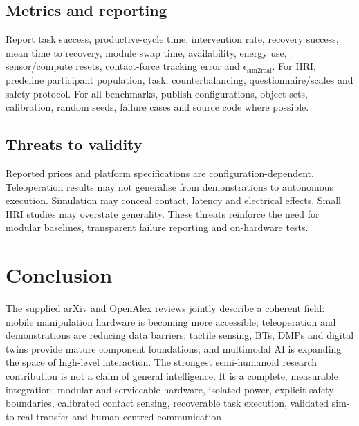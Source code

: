 \documentclass[10pt,a4paper]{article}
\begin{document}
\subsection{Metrics and reporting}
Report task success, productive-cycle time, intervention rate, recovery success, mean time to recovery, module swap time, availability, energy use, sensor/compute resets, contact-force tracking error and $\epsilon_{\mathrm{sim2real}}$. For HRI, predefine participant population, task, counterbalancing, questionnaire/scales and safety protocol. For all benchmarks, publish configurations, object sets, calibration, random seeds, failure cases and source code where possible.

\subsection{Threats to validity}
Reported prices and platform specifications are configuration-dependent. Teleoperation results may not generalise from demonstrations to autonomous execution. Simulation may conceal contact, latency and electrical effects. Small HRI studies may overstate generality. These threats reinforce the need for modular baselines, transparent failure reporting and on-hardware tests.

\section{Conclusion}
The supplied arXiv and OpenAlex reviews jointly describe a coherent field: mobile manipulation hardware is becoming more accessible; teleoperation and demonstrations are reducing data barriers; tactile sensing, BTs, DMPs and digital twins provide mature component foundations; and multimodal AI is expanding the space of high-level interaction. The strongest semi-humanoid research contribution is not a claim of general intelligence. It is a complete, measurable integration: modular and serviceable hardware, isolated power, explicit safety boundaries, calibrated contact sensing, recoverable task execution, validated sim-to-real transfer and human-centred communication.
\end{document}
